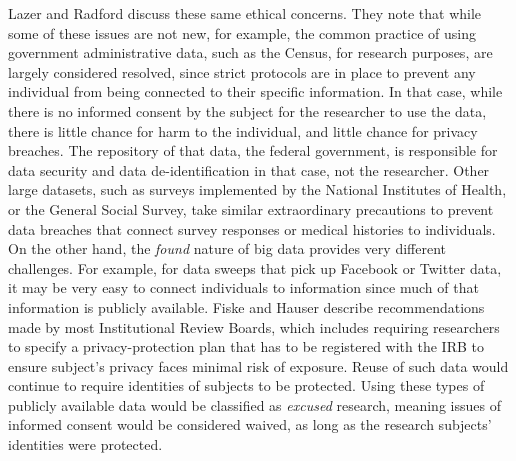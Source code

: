 \documentclass[sigconf]{acmart}
\begin{document}
Lazer and Radford discuss these same ethical concerns. \cite {lazer17}  They note that while some of these issues are not new, for example, the common practice of using government administrative data, such as the Census, for research purposes, are largely considered resolved, since strict protocols are in place to prevent any individual from being connected to their specific information.  In that case, while there is no informed consent by the subject for the researcher to use the data, there is little chance for harm to the individual, and little chance for privacy breaches.  The repository of that data, the federal government, is responsible for data security and data de-identification in that case, not the researcher.  Other large datasets, such as surveys implemented by the National Institutes of Health, or the General Social Survey, take similar extraordinary precautions to prevent data breaches that connect survey responses or medical histories to individuals.\cite {lazer17}  On the other hand, the {\em found} nature of big data provides very different challenges.  For example, for data sweeps that pick up Facebook or Twitter data, it may be very easy to connect individuals to information since much of that information is publicly available.  Fiske and Hauser describe recommendations made by most Institutional Review Boards, which includes requiring researchers to specify a privacy-protection plan that has to be registered with the IRB to ensure subject's privacy faces minimal risk of exposure.  Reuse of such data would continue to require identities of subjects to be protected.  Using these types of publicly available data would be classified as {\em excused} research, meaning issues of informed consent would be considered waived, as long as the research subjects' identities were protected. \cite{fiske14}
\end{document}
